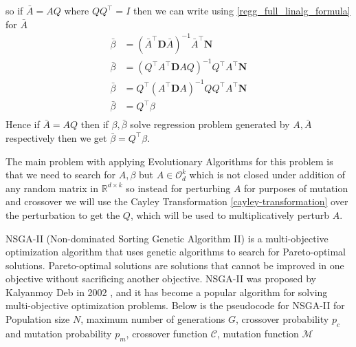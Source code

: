 \newline so if $\bar{A}=AQ$ where $QQ^\top = I$ then we can write using \ref{regg_full_linalg_formula} for $\bar{A}$
\begin{equation}
\begin{aligned} 
    \bar{\beta} &= (\bar{A}^\top \mathbf{D} \bar{A})^{-1} \bar{A}^\top \mathbf{N}\\
    \bar{\beta} &= (Q^\top A^\top \mathbf{D} AQ)^{-1} Q^\top A^\top \mathbf{N}\\
    \bar{\beta} &= Q^\top (A^\top \mathbf{D} A)^{-1} Q Q^\top A^\top \mathbf{N}\\
    \bar{\beta} &= Q^\top \beta\\
\end{aligned}
\end{equation}
Hence if $\bar{A} = AQ$ then if $\beta, \bar{\beta}$ solve regression problem generated by $A, \bar{A}$ respectively then we get $\bar{\beta} = Q^\top\beta$. 

\newpage
{}
The main problem with applying Evolutionary Algorithms for this problem is that we need to search for $A,\beta$ but $A \in \mathcal{O}^{k}_{d}$ which is not closed under addition of any random matrix in $\mathbb{R}^{d\times k}$ so instead for perturbing $A$ for purposes of mutation and crossover we will use the Cayley Transformation \ref{cayley-transformation} over the perturbation to get the $Q$, which will be used to multiplicatively perturb $A$.

NSGA-II (Non-dominated Sorting Genetic Algorithm II) is a multi-objective optimization algorithm that uses genetic algorithms to search for Pareto-optimal solutions. Pareto-optimal solutions are solutions that cannot be improved in one objective without sacrificing another objective. NSGA-II was proposed by Kalyanmoy Deb in 2002 \cite{deb2002fast}, and it has become a popular algorithm for solving multi-objective optimization problems.
\newline \newline Below is the pseudocode for NSGA-II for Population size $N$, maximum number of generations $G$, crossover probability $p_c$ and mutation probability $p_m$, crossover function $\mathcal{C}$, mutation function $\mathcal{M}$

